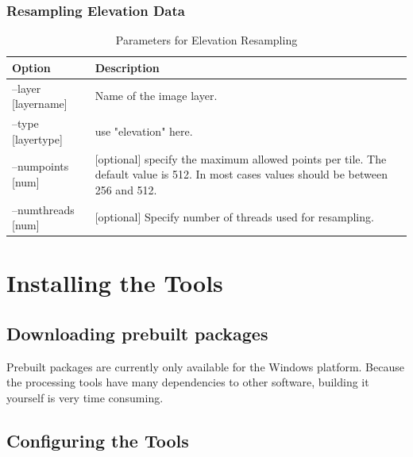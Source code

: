 \documentclass[
	12pt,
	a4paper,
	english,	
	appendixprefix,				     			        
	openany,		     	
	abstracton,		    		    
 	BCOR8mm,		    
]{scrartcl}
\begin{document}
\subsubsection{Resampling Elevation Data}


\begin{table}[H]
\centering
\begin{tabular}{|l|p{6cm}|}
\hline
\textbf{Option}	& \textbf{Description}\\
\hline
--layer [layername]  & Name of the image layer.\\
\hline
--type [layertype]  & use "elevation" here.\\
\hline
--numpoints [num]  & [optional] specify the maximum allowed points per tile. The default value is 512. In most cases values should be between 256 and 512.\\
\hline
--numthreads [num] & [optional] Specify number of threads used for resampling.\\
\hline
\end{tabular}
\caption{Parameters for Elevation Resampling}
\end{table}



\section{Installing the Tools}


\subsection{Downloading prebuilt packages}

Prebuilt packages are currently only available for the Windows platform.
Because the processing tools have many dependencies to other software, building it yourself is very time consuming.


\subsection{Configuring the Tools}
\end{document}
